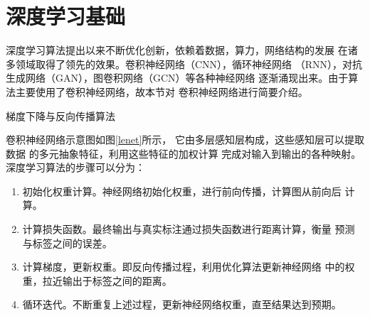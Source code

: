 \section{深度学习基础}
深度学习算法提出以来不断优化创新，依赖着数据，算力，网络结构的发展
在诸多领域取得了领先的效果。卷积神经网络（CNN），循环神经网络
（RNN），对抗生成网络（GAN），图卷积网络（GCN）等各种神经网络
逐渐涌现出来。由于算法主要使用了卷积神经网络，故本节对
卷积神经网络进行简要介绍。
\begin{algorithm}[htb]
	\caption{梯度下降与反向传播算法}
	\label{sgd}
\end{algorithm}

卷积神经网络示意图如图\ref{lenet}所示，
它由多层感知层构成，这些感知层可以提取数据
的多元抽象特征，利用这些特征的加权计算
完成对输入到输出的各种映射。
深度学习算法的步骤可以分为：
\begin{enumerate}
	\item 初始化权重计算。神经网络初始化权重，进行前向传播，计算图从前向后
	计算。
	\item 计算损失函数。最终输出与真实标注通过损失函数进行距离计算，衡量
	预测与标签之间的误差。
	\item 计算梯度，更新权重。即反向传播过程，利用优化算法更新神经网络
	中的权重，拉近输出于标签之间的距离。
	\item 循环迭代。不断重复上述过程，更新神经网络权重，直至结果达到预期。
\end{enumerate}

